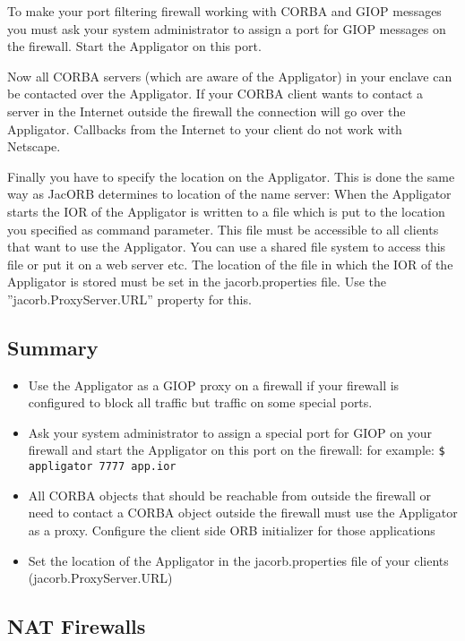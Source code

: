 To make your port filtering firewall working with CORBA and GIOP
messages you must ask your system administrator to assign a port for
GIOP messages on the firewall. Start the Appligator on this port.

Now all CORBA servers (which are aware of the Appligator) in your
enclave can be contacted over the Appligator. If your CORBA client
wants to contact a server in the Internet outside the firewall the
connection will go over the Appligator. Callbacks from the Internet to
your client do not work with Netscape.

Finally you have to specify the location on the Appligator. This is
done the same way as JacORB determines to location of the name server:
When the Appligator starts the IOR of the Appligator is written to a
file which is put to the location you specified as command
parameter. This file must be accessible to all clients that want to
use the Appligator. You can use a shared file system to access this
file or put it on a web server etc. The location of the file in which
the IOR of the Appligator is stored must be set in the
jacorb.properties file. Use the ''jacorb.ProxyServer.URL'' property
for this.

\subsection{Summary}

\begin{itemize}
\item Use the Appligator as a GIOP proxy on a firewall if your
  firewall is configured to block all traffic but traffic on some
  special ports.
\item Ask your system administrator to assign a special port for GIOP
  on your firewall and start the Appligator on this port on the
  firewall: for example:
\verb+$ appligator 7777 app.ior+
\item All CORBA objects that should be reachable from outside the firewall or need to contact a CORBA object outside the firewall must use the Appligator as a proxy. Configure the client side ORB initializer for those applications
\item Set the location of the Appligator in the jacorb.properties file
  of your clients (jacorb.ProxyServer.URL)
\end{itemize}

\subsection{NAT Firewalls}

